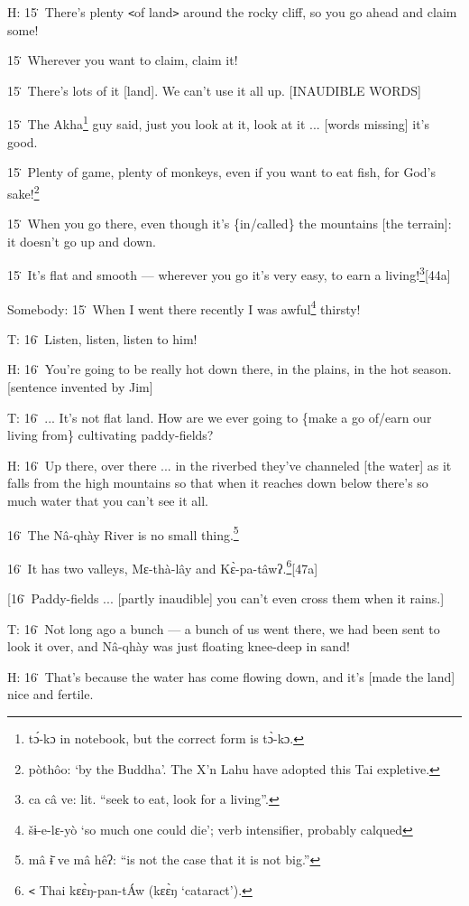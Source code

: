 H: 15\. There's plenty \texttt{<}of land\texttt{>} around the rocky cliff, so you
go ahead and claim some!

15\. Wherever you want to claim, claim it!

15\. There's lots of it [land]. We can't use it all up. [INAUDIBLE WORDS]

15\. The Akha\footnote{tɔ́-kɔ in notebook, but the correct form is tɔ̀-kɔ.} guy said, just you look at it, look at it ... [words missing]
it's good.

15\. Plenty of game, plenty of monkeys, even if you want to eat fish, for God's
sake!\footnote{pòthôo: `by the Buddha'. The X'n Lahu have adopted this Tai expletive.}

15\. When you go there, even though it's \{in/called\} the mountains [the terrain]:
it doesn't go up and down.

15\. It's flat and smooth --- wherever you go it's very easy, to earn a living!\footnote{ca câ ve: lit. ``seek to eat, look for a living''.}[44a]

Somebody: 15\. When I went there recently I was awful\footnote{šɨ-e-lɛ-yò `so much one could die'; verb intensifier, probably calqued} thirsty!

T: 16\. Listen, listen, listen to him!

H: 16\. You're going to be really hot down there, in the plains, in the hot season.
[sentence invented by Jim]

T: 16\. ... It's not flat land. How are we ever going to \{make a go of/earn our
living from\} cultivating paddy-fields?

H: 16\. Up there, over there ... in the riverbed they've channeled [the water]
as it falls from the high mountains so that when it reaches down below there's
so much water that you can't see it all.

16\. The Nâ-qhày River is no small thing.\footnote{mâ ɨ̄ ve mâ hêʔ: ``is not the case that it is not big.''}

16\. It has two valleys, Mɛ-thà-lây and Kɛ̀-pa-tâwʔ.\footnote{\texttt{<} Thai kɛɛ̀ŋ-pan-tÁw (kɛɛ̀ŋ `cataract').}[47a]

[16\. Paddy-fields ... [partly inaudible] you can't even cross them when it rains.]

T: 16\. Not long ago a bunch --- a bunch of us went there, we had been sent to
look it over, and Nâ-qhày was just floating knee-deep in sand!

H: 16\. That's because the water has come flowing down, and it's [made the land]
nice and fertile.

